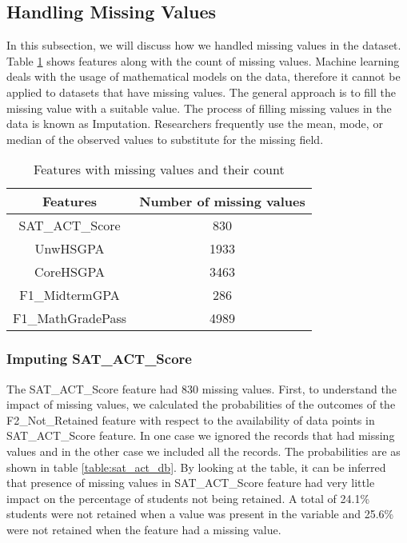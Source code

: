\documentclass[11pt,openright]{report}
\begin{document}
\subsection {Handling Missing Values}
In this subsection, we will discuss how we handled missing values in the dataset. Table \ref{table:missing_db} shows features along with the count of missing values. Machine learning deals with the usage of mathematical models on the data, therefore it cannot be applied to datasets that have missing values. The general approach is to fill the missing value with a suitable value. The process of filling missing values in the data is known as Imputation. Researchers frequently use the mean, mode, or median of the observed values to substitute for the missing field.
 \begin{table}[!htb]
	\renewcommand{\arraystretch}{1.3}
	\caption{Features with missing values and their count}
	\label{table:missing_db}
	\centering
	\begin{tabular}{|c|c|}
		\hline
		\bfseries Features & \bfseries Number of missing values \\
		\hline
		SAT\_ACT\_Score & 830\\ \hline
		UnwHSGPA & 1933\\ \hline
		CoreHSGPA & 3463\\ \hline
		F1\_MidtermGPA & 286\\ \hline
		F1\_MathGradePass & 4989\\ \hline
	\end{tabular}
\end{table}

\subsubsection {Imputing SAT\_ACT\_Score}
The SAT\_ACT\_Score feature had 830 missing values. First, to understand the impact of missing values, we calculated the probabilities of the outcomes of  the F2\_Not\_Retained feature with respect to the availability of data points in SAT\_ACT\_Score feature. In one case we ignored the records that had missing values and in the other case we included all the records. The probabilities are as shown in table \ref{table:sat_act_db}. By looking at the table, it can be inferred that presence of missing values in SAT\_ACT\_Score feature had very little impact on the percentage of students not being retained. A total of 24.1\% students were not retained when a value was present in the variable and 25.6\% were not retained when the feature had a missing value.
\end{document}
